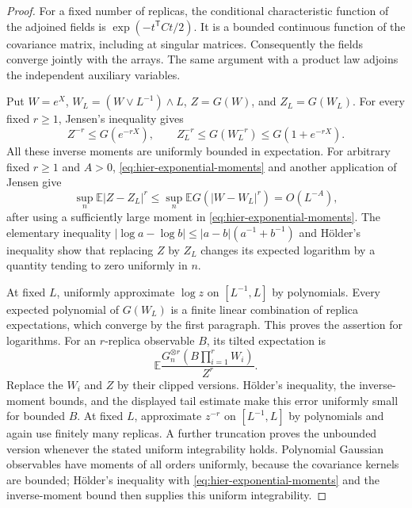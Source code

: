 \documentclass[11pt,a4paper]{article}
\numberwithin{equation}{section}
\theoremstyle{definition}
\theoremstyle{remark}
\newcommand{\E}{\mathbb E}
\begin{document}
\begin{proof}
For a fixed number of replicas, the conditional characteristic function of
the adjoined fields is $\exp(-t^{\mathsf T}Ct/2)$.  It is a bounded continuous
function of the covariance matrix, including at singular matrices.
Consequently the fields converge jointly with the arrays.  The same
argument with a product law adjoins the independent auxiliary variables.

Put $W=e^X$, $W_L=(W\vee L^{-1})\wedge L$, $Z=G(W)$, and $Z_L=G(W_L)$.
For every fixed $r\ge1$, Jensen's inequality gives
\[
 Z^{-r}\le G(e^{-rX}),\qquad
 Z_L^{-r}\le G(W_L^{-r})\le G(1+e^{-rX}).
\]
All these inverse moments are uniformly bounded in expectation.  For
arbitrary fixed $r\ge1$ and $A>0$, \eqref{eq:hier-exponential-moments} and another
application of Jensen give
\[
 \sup_n\E|Z-Z_L|^r
 \le\sup_n\E G(|W-W_L|^r)=O(L^{-A}),
\]
after using a sufficiently large moment in
\eqref{eq:hier-exponential-moments}.  The elementary inequality
$|\log a-\log b|\le |a-b|(a^{-1}+b^{-1})$ and H\"older's inequality show that
replacing $Z$ by $Z_L$ changes its expected logarithm by a quantity tending
to zero uniformly in $n$.

At fixed $L$, uniformly approximate $\log z$ on $[L^{-1},L]$ by polynomials.
Every expected polynomial of $G(W_L)$ is a finite linear combination of
replica expectations, which converge by the first paragraph.  This proves
the assertion for logarithms.  For an $r$-replica observable $B$, its tilted
expectation is
\[
 \E\frac{G_n^{\otimes r}(B\prod_{i=1}^rW_i)}{Z^r}.
\]
Replace the $W_i$ and $Z$ by their clipped versions.  H\"older's inequality,
the inverse-moment bounds, and the displayed tail estimate make this error
uniformly small for bounded $B$.  At fixed $L$, approximate $z^{-r}$ on
$[L^{-1},L]$ by polynomials and again use finitely many replicas.  A further
truncation proves the unbounded version whenever the stated uniform
integrability holds.  Polynomial Gaussian observables have moments of all
orders uniformly, because the covariance kernels are bounded; H\"older's
inequality with \eqref{eq:hier-exponential-moments} and the inverse-moment
bound then supplies this uniform integrability.
\end{proof}
\end{document}
